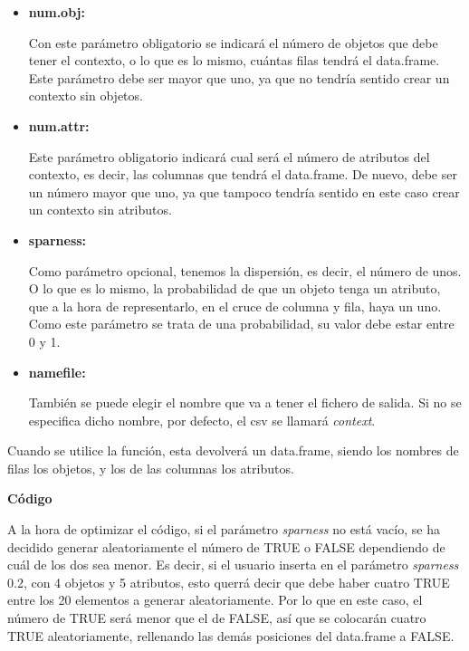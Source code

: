     \begin{itemize}
        \item \textbf{num.obj:}

        Con este par\'ametro obligatorio se indicar\'a el n\'umero de objetos que debe tener el contexto, o lo que es lo mismo, 
        cu\'antas filas tendr\'a el data.frame. Este par\'ametro debe ser mayor que uno, 
        ya que no tendr\'ia sentido crear un contexto sin objetos.


        \item \textbf{num.attr:}

        Este par\'ametro obligatorio indicar\'a cual ser\'a el n\'umero de atributos del contexto, es decir, las columnas que tendr\'a el 
        data.frame. De nuevo, debe ser un n\'umero mayor que uno, ya que tampoco tendr\'ia sentido en este caso crear un contexto sin 
        atributos.

        \item \textbf{sparness:}

        Como par\'ametro opcional, tenemos la dispersi\'on, es decir, el n\'umero de unos. O lo que es lo mismo, la probabilidad 
        de que un objeto tenga un atributo, que a la hora de representarlo, en el cruce de columna y fila, haya un uno.
        Como este par\'ametro se trata de una probabilidad, su valor debe estar entre 0 y 1.

        \item \textbf{namefile:}

        Tambi\'en se puede elegir el nombre que va a tener el fichero de salida. Si no se especifica dicho nombre, por defecto, el 
        csv se llamar\'a \textit{context}.

    \end{itemize}


    Cuando se utilice la funci\'on, esta devolver\'a un data.frame, siendo los nombres de filas los objetos, y los de las columnas 
    los atributos.


    \bigskip

    \textbf{C\'odigo}

    A la hora de optimizar el c\'odigo, si el par\'ametro \textit{sparness} no est\'a vac\'io, se ha decidido generar aleatoriamente el n\'umero de 
    TRUE o FALSE dependiendo de cu\'al de los dos sea menor. Es decir, si el usuario inserta en el par\'ametro \textit{sparness} 0.2, con 4 objetos 
    y 5 atributos, esto querr\'a decir que debe haber cuatro TRUE entre los 20 elementos a generar aleatoriamente. Por lo que en este caso, 
    el n\'umero de TRUE ser\'a menor que el de FALSE, as\'i que se colocar\'an cuatro TRUE aleatoriamente, rellenando las dem\'as posiciones 
    del data.frame a FALSE.

